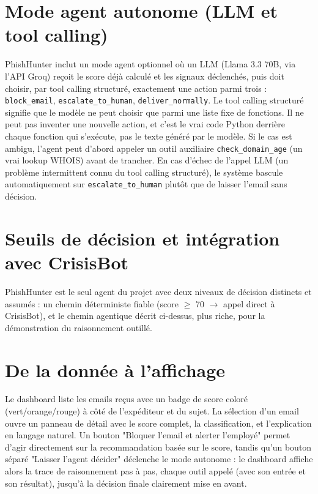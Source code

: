 \documentclass[12pt,a4paper]{report}
\begin{document}
\section{Mode agent autonome (LLM et tool calling)}

PhishHunter inclut un mode agent optionnel où un LLM (Llama 3.3 70B, via l'API Groq) reçoit le score déjà calculé et les signaux déclenchés, puis doit choisir, par tool calling structuré, exactement une action parmi trois : \texttt{block\_email}, \texttt{escalate\_to\_human}, \texttt{deliver\_normally}. Le tool calling structuré signifie que le modèle ne peut choisir que parmi une liste fixe de fonctions. Il ne peut pas inventer une nouvelle action, et c'est le vrai code Python derrière chaque fonction qui s'exécute, pas le texte généré par le modèle. Si le cas est ambigu, l'agent peut d'abord appeler un outil auxiliaire \texttt{check\_domain\_age} (un vrai lookup WHOIS) avant de trancher. En cas d'échec de l'appel LLM (un problème intermittent connu du tool calling structuré), le système bascule automatiquement sur \texttt{escalate\_to\_human} plutôt que de laisser l'email sans décision.

\section{Seuils de décision et intégration avec CrisisBot}

PhishHunter est le seul agent du projet avec deux niveaux de décision distincts et assumés : un chemin déterministe fiable (score $\geq$ 70 $\rightarrow$ appel direct à CrisisBot), et le chemin agentique décrit ci-dessus, plus riche, pour la démonstration du raisonnement outillé.

\section{De la donnée à l'affichage}

Le dashboard liste les emails reçus avec un badge de score coloré (vert/orange/rouge) à côté de l'expéditeur et du sujet. La sélection d'un email ouvre un panneau de détail avec le score complet, la classification, et l'explication en langage naturel. Un bouton "Bloquer l'email et alerter l'employé" permet d'agir directement sur la recommandation basée sur le score, tandis qu'un bouton séparé "Laisser l'agent décider" déclenche le mode autonome : le dashboard affiche alors la trace de raisonnement pas à pas, chaque outil appelé (avec son entrée et son résultat), jusqu'à la décision finale clairement mise en avant.
\end{document}
